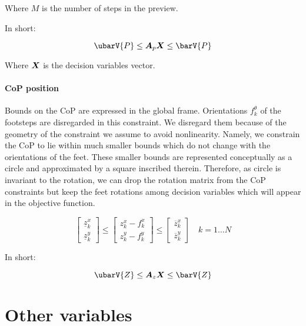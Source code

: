 \documentclass[a4paper]{article}
\begin{document}
\noindent Where $M$ is the number of steps in the preview.

\noindent In short:

\begin{equation}
\ubarV{P} \le \M{A}_{p}\V{X} \le \barV{P}
\end{equation}

\noindent Where $\V{X}$ is the decision variables vector.


\paragraph{CoP position}
Bounds on the CoP are expressed in the global frame. Orientations $f^{\theta}_k$ of the footsteps are disregarded in this constraint. We disregard them because of the geometry of the constraint we assume to avoid
nonlinearity. Namely, we constrain the CoP to lie within much smaller bounds which do not change with the orientations of the feet. These smaller bounds are represented conceptually as a circle and approximated by a square inscribed therein.
Therefore, as circle is invariant to the rotation, we can drop the rotation matrix from the CoP constraints but keep the feet rotations among decision variables which will appear in the objective function.

\begin{equation}
\begin{bmatrix}
    \underline{z}^{x}_{k} \\
    \underline{z}^{y}_{k}     
\end{bmatrix}
\leq
\begin{bmatrix}
    z^{x}_{k} - f^{x}_{k} \\
    z^{y}_{k} - f^{y}_{k}     
\end{bmatrix}
\leq
\begin{bmatrix}
    \overline{z}^{x}_{k} \\
    \overline{z}^{y}_{k}     
\end{bmatrix}
\quad k = 1 \dots N
\end{equation}

\noindent In short:

\begin{equation}
\ubarV{Z} \le \M{A}_{z}\V{X} \le \barV{Z}
\end{equation}

\section*{Other variables}
\end{document}

